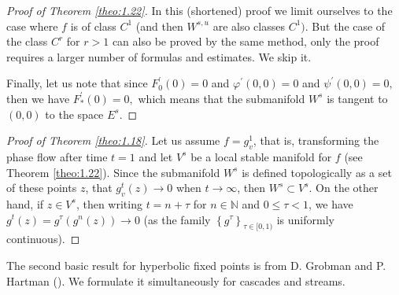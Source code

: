 \begin{proof}[Proof of Theorem \ref{theo:1.22}]
	In this (shortened) proof we limit ourselves to the case where $ f $ is of class $ C ^ {1} $ (and then $ W ^ {s, u} $ are also classes $ C ^ {1}) $. But the case of the class $ C ^ {r} $ for $ r> 1 $ can also be proved by the same method, only the proof requires a larger number of formulas and estimates. We skip it.
	
	Finally, let us note that since $ F_ {0} ^ {\prime} (0) = 0 $ and $ \varphi ^ {\prime} (0,0) = 0 $ and $\psi ^{\prime }(0,0)=0,$ then we have $ F_ {\ast} ^ {\prime} (0) = 0, $ which means that the submanifold $ W ^ {s} $ is tangent to $ \left (0,0 \right) $ to the space $ E ^ {s} $.
\end{proof}

\begin{proof}[Proof of Theorem \ref{theo:1.18}]
	Let us assume $ f = g_ {v} ^ {1}$, that is, transforming the phase flow after time $ t = 1 $ and let $ V ^ {s} $ be a local stable manifold for $ f $ (see Theorem \ref{theo:1.22}). Since the submanifold $ W ^ {s} $ is defined topologically as a set of these points $ z $, that $ g_ {v} ^ {t} (z) \rightarrow 0 $  when $ t \rightarrow \infty$, then $ W ^ {s} \subset V ^ {s} $. On the other hand, if $ z \in V ^ {s} $, then writing $ t = n + \tau $ for $ n \in \mathbb {N} $ and $ 0 \leq \tau <1$, we have $g^{t}(z)=g^{\tau
	}(g^{n}(z))\rightarrow 0$ (as the family $\left\{ g^{\tau }\right\}_{\tau \in \lbrack 0,1)}$ is uniformly continuous).
\end{proof}

The second basic result for hyperbolic fixed points is from D. Grobman and P. Hartman (\cite {Hart}). We formulate it simultaneously for cascades and streams.

